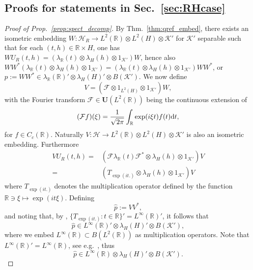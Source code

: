 \documentclass[sn-mathphys-num]{sn-jnl}%
\newcommand{\RR}{\mathbb{R}}
\newcommand{\HH}{\mathcal{H}}
\newcommand{\KK}{\mathcal{K}}
\newcommand{\diff}{\textup{d}}
\numberwithin{equation}{section}
\theoremstyle{thmstyleone}%
\theoremstyle{thmstyletwo}%
\theoremstyle{thmstylethree}%
\begin{document}
    \subsection{Proofs for statements in Sec.\ \ref{sec:RHcase}}
    \label{appx:spect_decomp_proof}
    \begin{proof}[Proof of Prop.\ \ref{prop:spect_decomp}]
    By Thm.\ \ref{thm:qref_embed}, there exists an isometric embedding $W:\HH_R\to L^2(\RR)\otimes L^2(H)\otimes \KK'$ for $\KK'$ separable such that for each $(t,h)\in \RR\times H$, one has $WU_R(t,h)=(\lambda_\RR(t)\otimes \lambda_H(h)\otimes 1_{\KK'})W$, hence also $WW^*(\lambda_\RR(t)\otimes \lambda_H(h)\otimes 1_{\KK'})=(\lambda_\RR(t)\otimes \lambda_H(h)\otimes 1_{\KK'})WW^*$, or $p:=WW^*\in \lambda_\RR(\RR)'\otimes \lambda_H(H)'\otimes B(\KK')$. We now define 
    \begin{equation}
        V=(\mathcal{F}\otimes 1_{L^2(H)}\otimes 1_{\KK'})W,
    \end{equation}
    with the Fourier transform $\mathcal{F}\in\mathbf{U}(L^2(\RR))$ being the continuous extension of 
    \begin{equation}
        (\mathcal{F}f)(\xi)=\frac{1}{\sqrt{2\pi}}\int_\RR \exp(i\xi t)f(t)\diff t,
    \end{equation}
    for $f\in C_c(\RR)$. Naturally $V:\HH\to L^2(\RR)\otimes L^2(H)\otimes\KK'$ is also an isometric embedding. Furthermore
    \begin{align}
        VU_R(t,h)=&(\mathcal{F}\lambda_\RR(t)\mathcal{F}^*\otimes \lambda_H(h)\otimes 1_{\KK'})V\nonumber\\
        =&(T_{\exp(it.)}\otimes \lambda_H(h)\otimes 1_{\KK'})V
    \end{align}
    where $T_{\exp(it.)}$ denotes the multiplication operator defined by the function $\RR\ni\xi \mapsto \exp(it\xi)$.
    Defining
    \begin{equation}
        \hat{p}:=VV^*,  
    \end{equation}
    and noting that, by \cite[Lem.\ B2]{vanDaele:1978}, $\{T_{\exp(it.)}:t\in\RR\}'=L^\infty(\RR)'$, it follows that 
    \begin{equation}
        \hat{p}\in L^\infty(\RR)'\otimes\lambda_H(H)'\otimes B(\KK'),
    \end{equation}
    where we embed $L^\infty(\RR)\subset B(L^2(\RR))$ as multiplication operators. Note that $L^\infty(\RR)'=L^\infty(\RR)$, see e.g.\ \cite[Thm.\ I.7.3.2]{dixmier1981VonNeumann}, thus
    \begin{equation}
        \hat{p}\in L^\infty(\RR)\otimes\lambda_H(H)'\otimes B(\KK').

\end{equation}
\end{proof}
\end{document}

